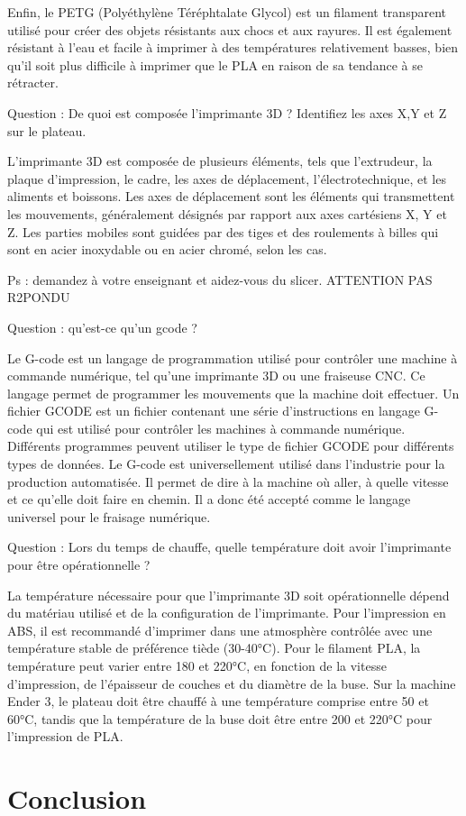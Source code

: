 \documentclass[12pt, letterpaper]{report}
\begin{document}
Enfin, le PETG (Polyéthylène Téréphtalate Glycol) est un filament transparent utilisé pour créer des objets résistants aux chocs et aux rayures. Il est également résistant à l'eau et facile à imprimer à des températures relativement basses, bien qu'il soit plus difficile à imprimer que le PLA en raison de sa tendance à se rétracter.

Question : De quoi est composée l’imprimante 3D ? Identifiez les axes X,Y et Z sur le plateau.

L'imprimante 3D est composée de plusieurs éléments, tels que l'extrudeur, la plaque d'impression, le cadre, les axes de déplacement, l'électrotechnique, et les aliments et boissons. Les axes de déplacement sont les éléments qui transmettent les mouvements, généralement désignés par rapport aux axes cartésiens X, Y et Z. Les parties mobiles sont guidées par des tiges et des roulements à billes qui sont en acier inoxydable ou en acier chromé, selon les cas.

Ps : demandez à votre enseignant et aidez-vous du slicer. ATTENTION PAS R2PONDU

Question : qu’est-ce qu’un gcode ?

Le G-code est un langage de programmation utilisé pour contrôler une machine à commande numérique, tel qu'une imprimante 3D ou une fraiseuse CNC. Ce langage permet de programmer les mouvements que la machine doit effectuer. Un fichier GCODE est un fichier contenant une série d'instructions en langage G-code qui est utilisé pour contrôler les machines à commande numérique. Différents programmes peuvent utiliser le type de fichier GCODE pour différents types de données. Le G-code est universellement utilisé dans l'industrie pour la production automatisée. Il permet de dire à la machine où aller, à quelle vitesse et ce qu'elle doit faire en chemin. Il a donc été accepté comme le langage universel pour le fraisage numérique.

Question : Lors du temps de chauffe, quelle température doit avoir l’imprimante pour être
opérationnelle ?

La température nécessaire pour que l'imprimante 3D soit opérationnelle dépend du matériau utilisé et de la configuration de l'imprimante. Pour l'impression en ABS, il est recommandé d'imprimer dans une atmosphère contrôlée avec une température stable de préférence tiède (30-40°C). Pour le filament PLA, la température peut varier entre 180 et 220°C, en fonction de la vitesse d'impression, de l'épaisseur de couches et du diamètre de la buse. Sur la machine Ender 3, le plateau doit être chauffé à une température comprise entre 50 et 60°C, tandis que la température de la buse doit être entre 200 et 220°C pour l'impression de PLA.

\chapter{Conclusion}
\end{document}
